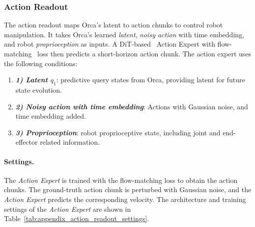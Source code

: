 \documentclass{llmxive}
\begin{document}
\subsubsection{Action Readout}
\label{sec:appendix_action_readout}
The action readout maps Orca's latent to action chunks to control robot manipulation. It takes Orca's learned \textit{latent}, \textit{noisy action} with time embedding, and robot \textit{proprioception} as inputs. A DiT-based~\citep{dit} Action Expert with flow-matching~\citep{flow_matching} loss then predicts a short-horizon action chunk. The action expert uses the following conditions: 

\begin{enumerate}[
    leftmargin=1.35em,
    itemsep=0.35em,
    topsep=0.35em,
    parsep=0em
]
    \item[] \textbf{\textit{1) Latent \(q_1\)}}: predictive query states from Orca, providing latent for future state evolution. 
    \item[] \textbf{\textit{2) Noisy action with time embedding}}: Actions with Gaussian noise, and time embedding added.
    \item[] \textbf{\textit{3) Proprioception}}: robot proprioceptive state, including joint and end-effector related information. 
\end{enumerate} 


\paragraph{Settings.} 
The \textit{Action Expert} is trained with the flow-matching loss to obtain the action chunks. The ground-truth action chunk is perturbed with Gaussian noise, and the \textit{Action Expert} predicts the corresponding velocity.
The architecture and training settings of the \textit{Action Expert} are shown in Table~\ref{tab:appendix_action_readout_settings}.
\end{document}
